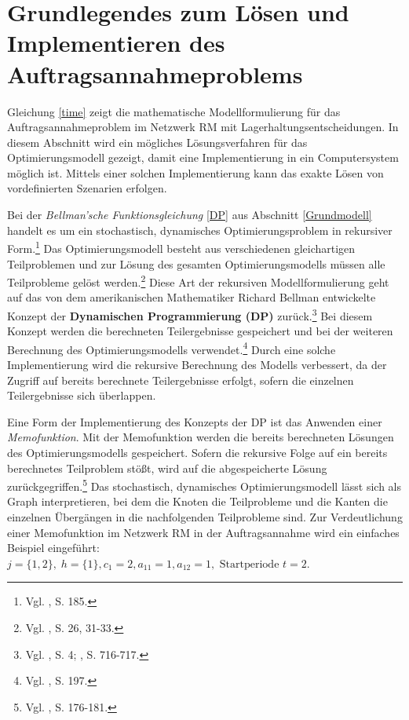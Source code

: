 \section{Grundlegendes zum Lösen und Implementieren des Auftragsannahmeproblems}\label{Implementierung}

Gleichung \eqref{time} zeigt die mathematische Modellformulierung für das Auftragsannahmeproblem im Netzwerk RM mit Lagerhaltungsentscheidungen. In diesem Abschnitt wird ein mögliches Lösungsverfahren für das Optimierungsmodell gezeigt, damit eine Implementierung in ein Computersystem möglich ist. Mittels einer solchen Implementierung kann das exakte Lösen von vordefinierten Szenarien erfolgen.

Bei der \textit{Bellman'sche Funktionsgleichung} \eqref{DP} aus Abschnitt \ref{Grundmodell} handelt es um ein stochastisch, dynamisches Optimierungsproblem in rekursiver Form.\footnote{Vgl. \cite{Petrick:2009aa}, S. 185.} Das Optimierungsmodell besteht aus verschiedenen gleichartigen Teilproblemen und zur Lösung des gesamten Optimierungsmodells müssen alle Teilprobleme gelöst werden.\footnote{Vgl. \cite{powell2007approximate}, S. 26, 31-33.} Diese Art der rekursiven Modellformulierung geht auf das von dem amerikanischen Mathematiker Richard Bellman entwickelte Konzept der \textbf{Dynamischen Programmierung (DP)} zurück.\footnote{Vgl. \cite{bellman1954theory}, S. 4; \cite{Bellman:1952aa}, S. 716-717.} Bei diesem Konzept werden die berechneten Teilergebnisse gespeichert und bei der weiteren Berechnung des Optimierungsmodells verwendet.\footnote{Vgl. \cite{owsnicki1999algorithmen}, S. 197.} Durch eine solche Implementierung wird die rekursive Berechnung des Modells verbessert, da der Zugriff auf bereits berechnete Teilergebnisse erfolgt, sofern die einzelnen Teilergebnisse sich überlappen.

Eine Form der Implementierung des Konzepts der DP ist das Anwenden einer \textit{Memofunktion}. Mit der Memofunktion werden die bereits berechneten Lösungen des Optimierungsmodells gespeichert. Sofern die rekursive Folge auf ein bereits berechnetes Teilproblem stößt, wird auf die abgespeicherte Lösung zurückgegriffen.\footnote{Vgl. \cite{hetland2010python}, S. 176-181.} Das stochastisch, dynamisches Optimierungsmodell lässt sich als Graph interpretieren, bei dem die Knoten die Teilprobleme und die Kanten die einzelnen Übergängen in die nachfolgenden Teilprobleme sind. Zur Verdeutlichung einer Memofunktion im Netzwerk RM in der Auftragsannahme wird ein einfaches Beispiel eingeführt: $j = \{1, 2\}, \; h = \{1\}, c_{1}=2, a_{11}=1, a_{12}=1, \text{ Startperiode } t=2.$

